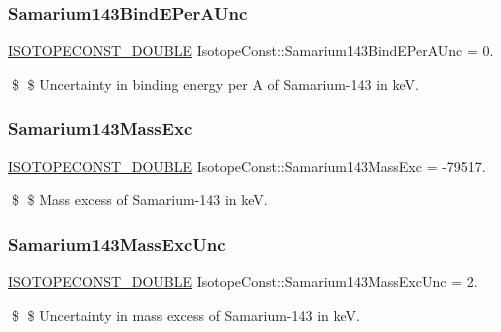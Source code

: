 \subsubsection{\texorpdfstring{Samarium143\+Bind\+E\+Per\+A\+Unc}{Samarium143BindEPerAUnc}}
{\footnotesize\ttfamily \mbox{\hyperlink{group___isotope_const-_macros_ga8f45a7272ce02c0b4c65c44636ed719a}{I\+S\+O\+T\+O\+P\+E\+C\+O\+N\+S\+T\+\_\+\+D\+O\+U\+B\+LE}} Isotope\+Const\+::\+Samarium143\+Bind\+E\+Per\+A\+Unc = 0.}

\$ \$ Uncertainty in binding energy per A of Samarium-\/143 in keV. \mbox{\label{group___isotope_const-_samarium-_sm143_ga2101ec148338c6a36bdca16701948265}} 
\subsubsection{\texorpdfstring{Samarium143\+Mass\+Exc}{Samarium143MassExc}}
{\footnotesize\ttfamily \mbox{\hyperlink{group___isotope_const-_macros_ga8f45a7272ce02c0b4c65c44636ed719a}{I\+S\+O\+T\+O\+P\+E\+C\+O\+N\+S\+T\+\_\+\+D\+O\+U\+B\+LE}} Isotope\+Const\+::\+Samarium143\+Mass\+Exc = -\/79517.}

\$ \$ Mass excess of Samarium-\/143 in keV. \mbox{\label{group___isotope_const-_samarium-_sm143_ga6286419ba542101a09767c69a7c71af0}} 
\subsubsection{\texorpdfstring{Samarium143\+Mass\+Exc\+Unc}{Samarium143MassExcUnc}}
{\footnotesize\ttfamily \mbox{\hyperlink{group___isotope_const-_macros_ga8f45a7272ce02c0b4c65c44636ed719a}{I\+S\+O\+T\+O\+P\+E\+C\+O\+N\+S\+T\+\_\+\+D\+O\+U\+B\+LE}} Isotope\+Const\+::\+Samarium143\+Mass\+Exc\+Unc = 2.}

\$ \$ Uncertainty in mass excess of Samarium-\/143 in keV. \mbox{\label{group___isotope_const-_samarium-_sm143_gadcab4c8c1f18f7720e39ce42b086eb75}} 
